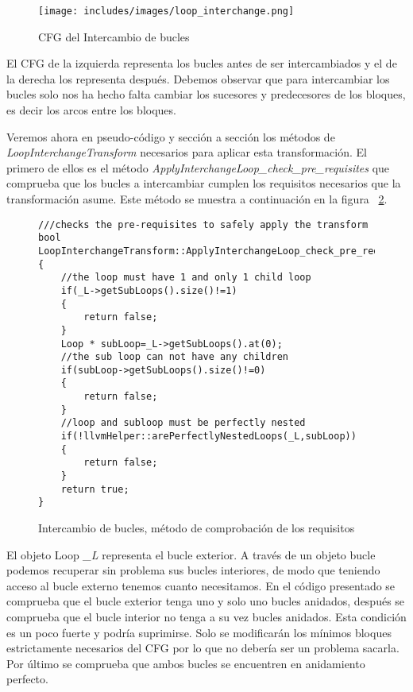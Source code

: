 \begin{figure}[t]
\centering
\texttt{[image: includes/images/loop\_interchange.png]}
\caption{CFG del Intercambio de bucles}
\label{fig:LoopInterchangeBlocks}
\end{figure}

El CFG de la izquierda representa los bucles antes de ser intercambiados y el de la derecha los representa después. Debemos observar que para intercambiar los bucles solo nos ha hecho falta cambiar los sucesores y predecesores de los bloques, es decir los arcos entre los bloques.

Veremos ahora en pseudo-código y sección a sección los métodos de \textit{LoopInterchangeTransform} necesarios para aplicar esta transformación.
El primero de ellos es el método \textit{ApplyInterchangeLoop\_check\_pre\_requisites} que comprueba que los bucles a intercambiar cumplen los requisitos necesarios que la transformación asume. Este método se muestra a continuación en la figura ~\ref{FIG:LoopInterchangeCheck}.


\begin{figure}[t]
\begin{lstlisting}
///checks the pre-requisites to safely apply the transform
bool LoopInterchangeTransform::ApplyInterchangeLoop_check_pre_requisites()
{
	//the loop must have 1 and only 1 child loop
	if(_L->getSubLoops().size()!=1)
	{
		return false;
	}
	Loop * subLoop=_L->getSubLoops().at(0);
	//the sub loop can not have any children
	if(subLoop->getSubLoops().size()!=0)
	{
		return false;
	}
	//loop and subloop must be perfectly nested
	if(!llvmHelper::arePerfectlyNestedLoops(_L,subLoop))
	{
		return false;
	}
	return true;
}
\end{lstlisting}
\caption{Intercambio de bucles, método de comprobación de los requisitos}
\label{FIG:LoopInterchangeCheck}
\end{figure}

El objeto Loop \textit{\_L} representa el bucle exterior. A través de un objeto bucle podemos recuperar sin problema sus bucles interiores, de modo que teniendo acceso al bucle externo tenemos cuanto necesitamos.
En el código presentado se comprueba que el bucle exterior tenga uno y solo uno bucles anidados, después se comprueba que el bucle interior no tenga a su vez bucles anidados. Esta condición es un poco fuerte y podría suprimirse. Solo se modificarán los mínimos bloques estrictamente necesarios del CFG por lo que no debería ser un problema sacarla.
Por último se comprueba que ambos bucles se encuentren en anidamiento perfecto.

